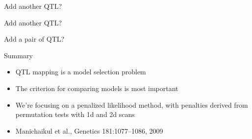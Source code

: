 \documentclass[aspectratio=169,12pt,t]{beamer}
\begin{document}
\addtocounter{page}{-1}

\begin{frame}[c]{Add another QTL?}


\end{frame}










\addtocounter{page}{-1}

\begin{frame}[c]{Add another QTL?}


\end{frame}






\begin{frame}[c]{Add a pair of QTL?}


\end{frame}







\begin{frame}{Summary}


\hfill \begin{minipage}{9.5in}

\begin{itemize}
\itemsep24pt
\item QTL mapping is a model selection problem
\item The criterion for comparing models is most important
\item We're focusing on a penalized likelihood method, with penalties
  derived from permutation tests with 1d and 2d scans
\item Manichaikul et al., Genetics 181:1077--1086, 2009
\end{itemize}

\end{minipage} \hspace{0.5in}

\end{frame}
\end{document}
